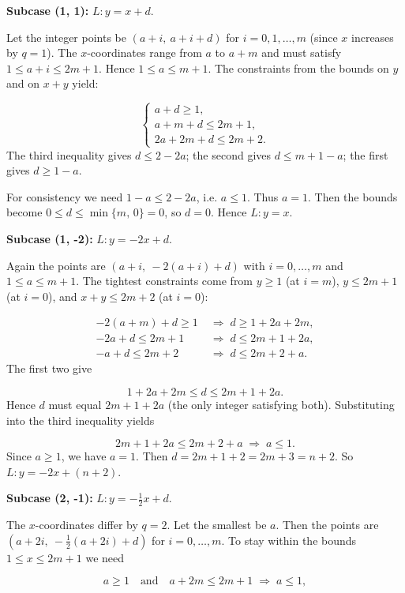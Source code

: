 \documentclass{llmxive}
\begin{document}
\smallskip
\textbf{Subcase (1, 1):} \(L: y = x + d\).\par
Let the integer points be \((a+i,\ a+i+d)\) for \(i = 0,1,\dots,m\) (since \(x\) increases by \(q=1\)). The \(x\)-coordinates range from \(a\) to \(a+m\) and must satisfy \(1 \le a+i \le 2m+1\). Hence \(1 \le a \le m+1\). The constraints from the bounds on \(y\) and on \(x+y\) yield:\par
\[
\begin{cases}
a+d \ge 1,\\
a+m+d \le 2m+1,\\
2a+2m+d \le 2m+2.
\end{cases}
\]
The third inequality gives \(d \le 2-2a\); the second gives \(d \le m+1 - a\); the first gives \(d \ge 1-a\).\par
For consistency we need \(1-a \le 2-2a\), i.e. \(a \le 1\). Thus \(a = 1\). Then the bounds become \(0 \le d \le \min\{m,\,0\} = 0\), so \(d = 0\). Hence \(L: y = x\).\par
\smallskip
\textbf{Subcase (1, -2):} \(L: y = -2x + d\).\par
Again the points are \((a+i,\ -2(a+i)+d)\) with \(i=0,\dots,m\) and \(1 \le a \le m+1\). The tightest constraints come from \(y \ge 1\) (at \(i=m\)), \(y \le 2m+1\) (at \(i=0\)), and \(x+y \le 2m+2\) (at \(i=0\)):\par
\[
\begin{aligned}
-2(a+m)+d \ge 1 \;&\Longrightarrow\; d \ge 1 + 2a + 2m,\\
-2a + d \le 2m+1 \;&\Longrightarrow\; d \le 2m+1 + 2a,\\
-a + d \le 2m+2 \;&\Longrightarrow\; d \le 2m+2 + a.
\end{aligned}
\]
The first two give\par
\[
1+2a+2m \le d \le 2m+1+2a.
\]
Hence \(d\) must equal \(2m+1+2a\) (the only integer satisfying both). Substituting into the third inequality yields\par
\[
2m+1+2a \le 2m+2 + a \;\Longrightarrow\; a \le 1.
\]
Since \(a \ge 1\), we have \(a = 1\). Then \(d = 2m+1+2 = 2m+3 = n+2\). So \(L: y = -2x + (n+2)\).\par
\smallskip
\textbf{Subcase (2, -1):} \(L: y = -\tfrac12 x + d\).\par
The \(x\)-coordinates differ by \(q=2\). Let the smallest be \(a\). Then the points are \((a+2i,\ -\tfrac12(a+2i)+d)\) for \(i=0,\dots,m\). To stay within the bounds \(1 \le x \le 2m+1\) we need\par
\[
a \ge 1 \quad\text{and}\quad a+2m \le 2m+1 \;\Longrightarrow\; a \le 1,
\]
\end{document}
